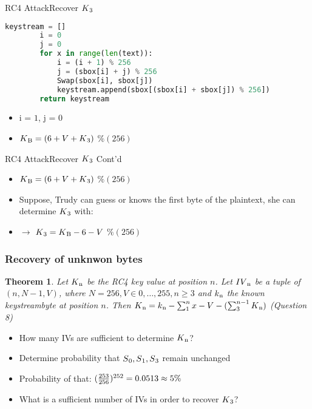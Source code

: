 \documentclass[
	aspectratio=169,	%
	onlytextwidth,		%
	t,					%
	]{beamer}
\newtheorem{thm}{Theorem}
\begin{document}
\begin{frame}[fragile]{RC4 Attack}{Recover $K\textsubscript{3}$}

	\begin{lstlisting}[language=Python]
		keystream = []
		i = 0
		j = 0
		for x in range(len(text)):
			i = (i + 1) % 256
			j = (sbox[i] + j) % 256
			Swap(sbox[i], sbox[j])
			keystream.append(sbox[(sbox[i] + sbox[j]) % 256])    
		return keystream   
	\end{lstlisting}
	\begin{itemize}
		\item i = $1$, j = $0$
		\item $K\textsubscript{B} = (6 + V + K\textsubscript{3})$ $\%(256)$
	\end{itemize}

\end{frame}

\begin{frame}[fragile]{RC4 Attack}{Recover $K\textsubscript{3}$ Cont'd}

	\begin{itemize}
		\item $K\textsubscript{B} = (6 + V + K\textsubscript{3})$ $\%(256)$
		\item Suppose, Trudy can guess or knows the first byte of the plaintext, she can determine $K\textsubscript{3}$ with:
		\item $\rightarrow$ $K\textsubscript{3}  = K\textsubscript{B} - 6 - V$ $\%(256)$
	\end{itemize}
\end{frame}

\begin{frame} 
	\frametitle{Recovery of unknwon bytes} 
	\begin{thm}
		Let $ K\textsubscript{n} $ be the RC4 key value at position $ n $. Let $ IV\textsubscript{n} $ be a tuple of $ (n, N-1, V) $,
		where $ N = 256, V \in {{0,\dots,255}}, n \geq 3 $ and $ k\textsubscript{n} $ the known keystreambyte at position $n$.
		Then $ K\textsubscript{n} = k\textsubscript{n} - \sum_{1}^{n}x - V - (\sum_{3}^{n-1}K\textsubscript{n}) $ (Question 8)
	\end{thm} 
	\begin{itemize}
		\item How many IVs are sufficient to determine $ K\textsubscript{n} $?
		\item Determine probability that $ S\textsubscript{0}, S\textsubscript{1}, S\textsubscript{3} $ remain unchanged
		\item Probability of that: $(\frac{253}{256})\textsuperscript{252} = 0.0513 \approx 5\%$
		\item What is a sufficient number of IVs in order to recover $K\textsubscript{3}$?
	\end{itemize}
\end{frame}
\end{document}
